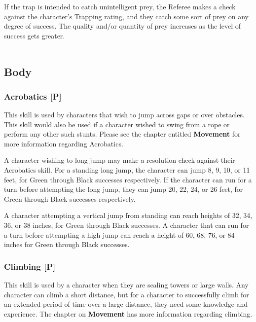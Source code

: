 \documentclass[oneside]{book}
\begin{document}
\begin{multicols}{2}
If the trap is intended to catch unintelligent prey, the Referee makes a check against the character's Trapping rating, and they catch some sort of prey on any degree of success. The quality and/or quantity of prey increases as the level of success gets greater. 
\\
\\
\subsection{Body}
\subsubsection{Acrobatics [P]}
This skill is used by characters that wish to jump across gaps or over obstacles. This skill would also be used if a character wished to swing from a rope or perform any other such stunts. Please see the chapter entitled \textbf{Movement} for more information regarding Acrobatics.

A character wishing to long jump may make a resolution check against their Acrobatics skill. For a standing long jump, the character can jump 8, 9, 10, or 11 feet, for Green through Black successes respectively.
If the character can run for a turn before attempting the long jump, they can jump 20, 22, 24, or 26 feet, for Green through Black successes respectively.

A character attempting a vertical jump from standing can reach heights of 32, 34, 36, or 38 inches, for Green through Black successes. A character that can run for a turn before attempting a high jump can reach a height of 60, 68, 76, or 84 inches for Green through Black successes.
\subsubsection{Climbing [P]}
This skill is used by a character when they are scaling towers or large walls. Any character can climb a short distance, but for a character to successfully climb for an extended period of time over a large distance, they need some knowledge and experience. The chapter on \textbf{Movement} has more information regarding climbing. 


\end{multicols}
\end{document}

